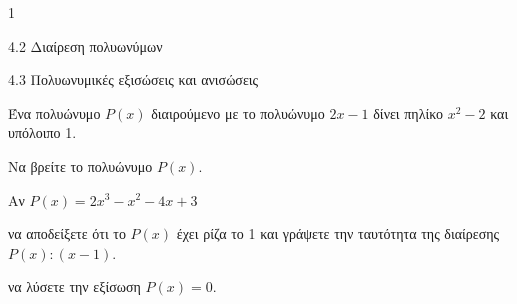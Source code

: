 \begin{ylh}{1}
\item 4.2 Διαίρεση πολυωνύμων
\item 4.3 Πολυωνυμικές εξισώσεις και ανισώσεις
\end{ylh}
Ένα πολυώνυμο $P(x)$ διαιρούμενο με το πολυώνυμο $2x - 1$ δίνει πηλίκο $x^2 - 2$ και υπόλοιπο 1.
\begin{alist}
\item Να βρείτε το πολυώνυμο $P(x)$.
\item Αν $P(x) = 2x^3 - x^2 - 4x + 3$
\begin{rlist}
\item να αποδείξετε ότι το $P(x)$ έχει ρίζα το 1 και γράψετε την ταυτότητα της διαίρεσης $P(x) : (x - 1)$.
\item να λύσετε την εξίσωση $P(x) = 0$.
\end{rlist}
\end{alist}

